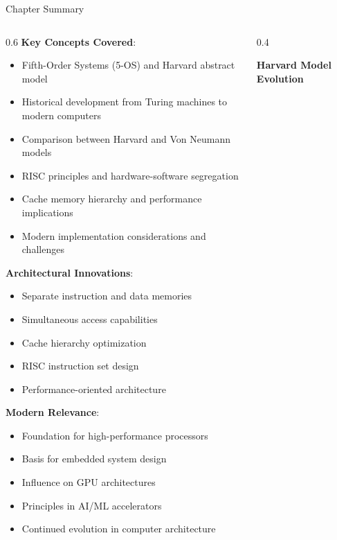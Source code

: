 \documentclass[aspectratio=169]{beamer}
\newcommand{\concept}[1]{\textbf{\color{darkblue}#1}}
\begin{document}
\begin{frame}{Chapter Summary}
\begin{columns}
\begin{column}{0.6\textwidth}
\concept{Key Concepts Covered}:
\begin{itemize}
\item Fifth-Order Systems (5-OS) and Harvard abstract model
\item Historical development from Turing machines to modern computers
\item Comparison between Harvard and Von Neumann models
\item RISC principles and hardware-software segregation
\item Cache memory hierarchy and performance implications
\item Modern implementation considerations and challenges
\end{itemize}

\vspace{0.3cm}
\concept{Architectural Innovations}:
\begin{itemize}
\item Separate instruction and data memories
\item Simultaneous access capabilities
\item Cache hierarchy optimization
\item RISC instruction set design
\item Performance-oriented architecture
\end{itemize}

\vspace{0.3cm}
\concept{Modern Relevance}:
\begin{itemize}
\item Foundation for high-performance processors
\item Basis for embedded system design
\item Influence on GPU architectures
\item Principles in AI/ML accelerators
\item Continued evolution in computer architecture
\end{itemize}
\end{column}
\begin{column}{0.4\textwidth}
\begin{center}
\textbf{Harvard Model Evolution}
\vspace{0.3cm}

\end{center}
\end{column}
\end{columns}
\end{frame}
\end{document}
